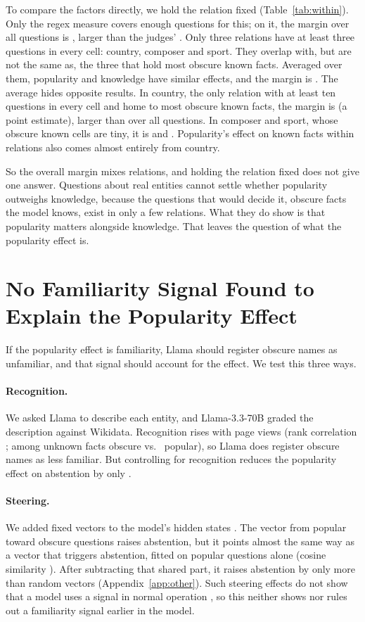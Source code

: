 \documentclass[11pt]{article}
\begin{document}
To compare the factors directly, we hold the relation fixed (Table~\ref{tab:within}). Only the regex measure covers enough questions for this; on it, the margin over all questions is \wrPooledPref, larger than the judges' \hmLlamaDiff. Only three relations have at least three questions in every cell: country, composer and sport. They overlap with, but are not the same as, the three that hold most obscure known facts. Averaged over them, popularity and knowledge have similar effects, and the margin is \wrPref{} \wrPrefCI. The average hides opposite results. In country, the only relation with at least ten questions in every cell and home to most obscure known facts, the margin is \wrCountry{} (a point estimate), larger than over all questions. In composer and sport, whose obscure known cells are tiny, it is \wrComposer{} and \wrSport. Popularity's effect on known facts within relations also comes almost entirely from country.

So the overall margin mixes relations, and holding the relation fixed does not give one answer. Questions about real entities cannot settle whether popularity outweighs knowledge, because the questions that would decide it, obscure facts the model knows, exist in only a few relations. What they do show is that popularity matters alongside knowledge. That leaves the question of what the popularity effect is.

\section{No Familiarity Signal Found to Explain the Popularity Effect}
\label{sec:mech}

If the popularity effect is familiarity, Llama should register obscure names as unfamiliar, and that signal should account for the effect. We test this three ways.

\paragraph{Recognition.} We asked Llama to describe each entity, and Llama-3.3-70B graded the description against Wikidata. Recognition rises with page views (rank correlation \ekRho; among unknown facts \mcObsUnkRec{} obscure vs.\ \mcPopUnkRec{} popular), so Llama does register obscure names as less familiar. But controlling for recognition reduces the popularity effect on abstention by only \ekShrink.

\paragraph{Steering.} We added fixed vectors to the model's hidden states \citep{arditi2024refusal}. The vector from popular toward obscure questions raises abstention, but it points almost the same way as a vector that triggers abstention, fitted on popular questions alone (cosine similarity \gaCos). After subtracting that shared part, it raises abstention by only \gaPerp{} \gaPerpCI{} more than random vectors (Appendix~\ref{app:other}). Such steering effects do not show that a model uses a signal in normal operation \citep{che2026steering}, so this neither shows nor rules out a familiarity signal earlier in the model.
\end{document}
